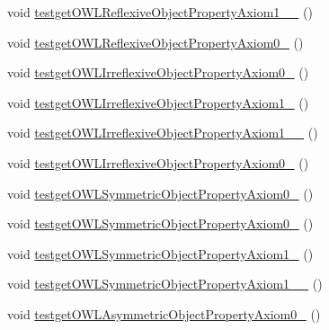 \begin{DoxyCompactItemize}
\item 
void \hyperlink{classorg_1_1semanticweb_1_1owlapi_1_1api_1_1test_1_1_null_check_test_case_af0af8dfee891f96698c5871732ad2026}{testget\-O\-W\-L\-Reflexive\-Object\-Property\-Axiom1\-\_\-\_} ()
\item 
void \hyperlink{classorg_1_1semanticweb_1_1owlapi_1_1api_1_1test_1_1_null_check_test_case_ab4900d792ab216011adb6d32c28dba38}{testget\-O\-W\-L\-Reflexive\-Object\-Property\-Axiom0\-\_} ()
\item 
void \hyperlink{classorg_1_1semanticweb_1_1owlapi_1_1api_1_1test_1_1_null_check_test_case_a973eb0ef320d197a85212b7f8c25d8dc}{testget\-O\-W\-L\-Irreflexive\-Object\-Property\-Axiom0\-\_} ()
\item 
void \hyperlink{classorg_1_1semanticweb_1_1owlapi_1_1api_1_1test_1_1_null_check_test_case_a79357153d4df996fd23048a24757ce61}{testget\-O\-W\-L\-Irreflexive\-Object\-Property\-Axiom1\-\_} ()
\item 
void \hyperlink{classorg_1_1semanticweb_1_1owlapi_1_1api_1_1test_1_1_null_check_test_case_a1c08d97efef0ebf12c12c567e47cf625}{testget\-O\-W\-L\-Irreflexive\-Object\-Property\-Axiom1\-\_\-\_} ()
\item 
void \hyperlink{classorg_1_1semanticweb_1_1owlapi_1_1api_1_1test_1_1_null_check_test_case_a181b5eec7b6f06ef5e9915224a581b62}{testget\-O\-W\-L\-Irreflexive\-Object\-Property\-Axiom0\-\_} ()
\item 
void \hyperlink{classorg_1_1semanticweb_1_1owlapi_1_1api_1_1test_1_1_null_check_test_case_aac114357a210be53543649aff6da81bd}{testget\-O\-W\-L\-Symmetric\-Object\-Property\-Axiom0\-\_} ()
\item 
void \hyperlink{classorg_1_1semanticweb_1_1owlapi_1_1api_1_1test_1_1_null_check_test_case_a98b5d20802a51f9b3c85d03000a31c31}{testget\-O\-W\-L\-Symmetric\-Object\-Property\-Axiom0\-\_} ()
\item 
void \hyperlink{classorg_1_1semanticweb_1_1owlapi_1_1api_1_1test_1_1_null_check_test_case_a117589e6d5195e916d8dc5e9b4114a5c}{testget\-O\-W\-L\-Symmetric\-Object\-Property\-Axiom1\-\_} ()
\item 
void \hyperlink{classorg_1_1semanticweb_1_1owlapi_1_1api_1_1test_1_1_null_check_test_case_ac1e9d5512bb166f5580d94f038d0a1a9}{testget\-O\-W\-L\-Symmetric\-Object\-Property\-Axiom1\-\_\-\_} ()
\item 
void \hyperlink{classorg_1_1semanticweb_1_1owlapi_1_1api_1_1test_1_1_null_check_test_case_a77f72045c38ce603b81e915572d83817}{testget\-O\-W\-L\-Asymmetric\-Object\-Property\-Axiom0\-\_} ()

\end{DoxyCompactItemize}
